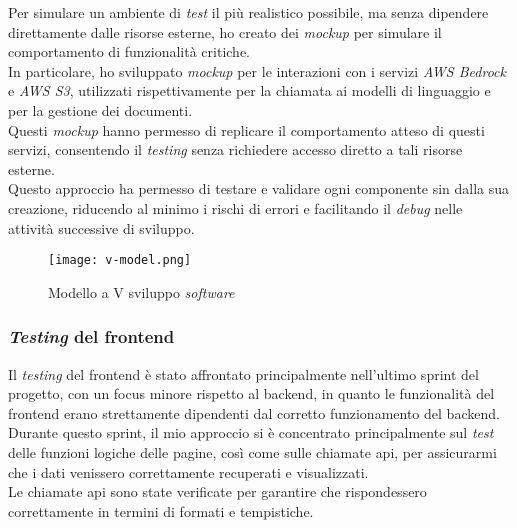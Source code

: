 \noindent Per simulare un ambiente di \textit{test} il più realistico possibile, ma senza dipendere direttamente dalle risorse esterne, ho creato dei \textit{mockup} per simulare il comportamento di funzionalità critiche.\\
In particolare, ho sviluppato \textit{mockup} per le interazioni con i servizi \textit{AWS Bedrock} e \textit{AWS S3}, utilizzati rispettivamente per la chiamata ai modelli di linguaggio e per la gestione dei documenti.\\
Questi \textit{mockup} hanno permesso di replicare il comportamento atteso di questi servizi, consentendo il \textit{testing} senza richiedere accesso diretto a tali risorse esterne.\\

\noindent Questo approccio ha permesso di testare e validare ogni componente sin dalla sua creazione, riducendo al minimo i rischi di errori e facilitando il \textit{debug} nelle attività successive di sviluppo.

\begin{figure}[H]
    \centering
    \texttt{[image: v-model.png]}
    \caption{Modello a V sviluppo \textit{software}}
    \label{fig:v-model}  
    \cite{site:v-model}
\end{figure}

\subsubsection{\textit{Testing} del \gls{frontend}}

Il \textit{testing} del \gls{frontend} è stato affrontato principalmente nell'ultimo \gls{sprint} del progetto, con un focus minore rispetto al \gls{backend}, in quanto le funzionalità del \gls{frontend} erano strettamente dipendenti dal corretto funzionamento del \gls{backend}.\\

\noindent Durante questo \gls{sprint}, il mio approccio si è concentrato principalmente sul \textit{test} delle funzioni logiche delle pagine, così come sulle chiamate \gls{api}, per assicurarmi che i dati venissero correttamente recuperati e visualizzati.\\
Le chiamate \gls{api} sono state verificate per garantire che rispondessero correttamente in termini di formati e tempistiche.\\


